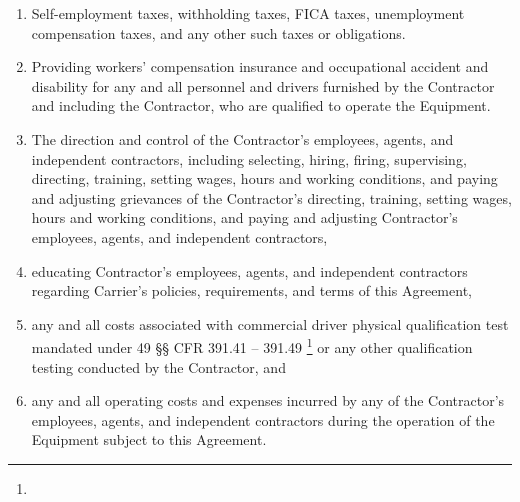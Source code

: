 \begin{enumerate}
\begin{enumerate}
        \item Self-employment taxes, withholding taxes, FICA taxes,
        unemployment compensation taxes, and any other such taxes or
        obligations.

        \item Providing workers' compensation insurance and occupational
        accident and disability for any and all personnel and drivers
        furnished by the Contractor and including the Contractor, who are
        qualified to operate the Equipment.

        \item The direction and control of the Contractor's employees,
        agents, and independent contractors, including selecting, hiring,
        firing, supervising, directing, training, setting wages, hours and
        working conditions, and paying and adjusting grievances of the
        Contractor's directing, training, setting wages, hours and working
        conditions, and paying and adjusting Contractor's employees,
        agents, and independent contractors,

        \item educating Contractor's employees, agents, and independent
        contractors regarding Carrier's policies, requirements, and terms
        of this Agreement,

        \item any and all costs associated with commercial driver physical
        qualification test mandated under 49 {\S\S} CFR 391.41 -- 391.49%
        \footnote{\PhysicalQualificationsAndExaminationsFootnote} or
        any other qualification testing conducted by the Contractor, and

        \item any and all operating costs and expenses incurred by any of
        the Contractor's employees, agents, and independent contractors
        during the operation of the Equipment subject to this Agreement.
    \end{enumerate}
\end{enumerate}